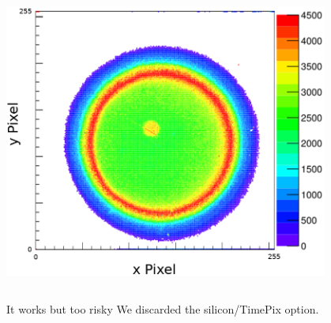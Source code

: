 \begin{frame}
\begin{columns}
\begin{column}{0.45\textwidth}
      \includegraphics[width=0.8\textwidth]{04_Test/fig/fig000_IRMA_damage3.png}
    \end{column}
  \end{columns}
  \begin{alertblock}{It works but too risky}
    We discarded the silicon/TimePix option.
  \end{alertblock}
\end{frame}

